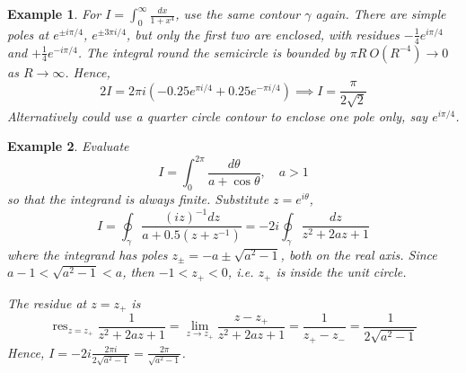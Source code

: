 \documentclass[a4paper]{article}
\DeclareMathOperator{\res}{res}
\newtheorem{eg}{Example}[section]
\theoremstyle{new}
\begin{document}
\begin{eg}
For $I=\int_0^\infty\frac{dx}{1+x^4}$, use the same contour $\gamma$ again. There are simple poles at $e^{\pm i\pi/4}$, $e^{\pm 3\pi i/4}$, but only the first two are enclosed, with residues $-\frac{1}{4}e^{i\pi/4}$ and $+\frac{1}{4}e^{-i\pi/4}$. The integral round the semicircle is bounded by $\pi R~O(R^{-4})\rightarrow 0$ as $R\rightarrow\infty$. Hence,
    $$2I=2\pi i(-0.25e^{\pi i/4}+0.25e^{-\pi i/4})\implies I=\frac{\pi}{2\sqrt{2}}$$
    Alternatively could use a quarter circle contour to enclose one pole only, say $e^{i\pi/4}$.
\end{eg}
\begin{eg}
Evaluate
$$I=\int_0^{2\pi}\frac{d\theta}{a+\cos\theta},\quad a>1$$
so that the integrand is always finite. Substitute $z=e^{i\theta}$,
$$I=\oint_{\gamma}\frac{(iz)^{-1}dz}{a+0.5(z+z^{-1})}=-2i\oint_\gamma\frac{dz}{z^2+2az+1}$$
where the integrand has poles $z_\pm=-a\pm\sqrt{a^2-1}$, both on the real axis. Since $a-1<\sqrt{a^2-1}<a$, then $-1<z_+<0$, i.e. $z_+$ is inside the unit circle. 
 \begin{center}
  \end{center}

The residue at $z=z_+$ is
$$\res_{z=z_+}\frac{1}{z^2+2az+1}=\lim_{z\rightarrow z_+}\frac{z-z_+}{z^2+2az+1}=\frac{1}{z_+-z_-}=\frac{1}{2\sqrt{a^2-1}}$$
Hence, $I=-2i\frac{2\pi i}{2\sqrt{a^2-1}}=\frac{2\pi}{\sqrt{a^2-1}}$.
\end{eg}
\end{document}
